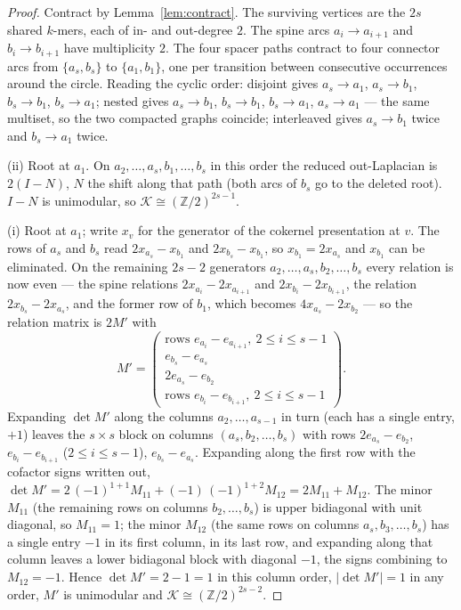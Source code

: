 \documentclass[11pt]{article}
\theoremstyle{plain}
\theoremstyle{definition}
\theoremstyle{remark}
\newcommand{\Z}{\mathbb{Z}}
\newcommand{\K}{\mathcal{K}}
\begin{document}
\begin{proof}
Contract by Lemma~\ref{lem:contract}. The surviving vertices are the $2s$ shared $k$-mers,
each of in- and out-degree $2$. The spine arcs $a_i\to a_{i+1}$ and $b_i\to b_{i+1}$ have
multiplicity $2$. The four spacer paths contract to four connector arcs from
$\{a_s,b_s\}$ to $\{a_1,b_1\}$, one per transition between consecutive occurrences around
the circle. Reading the cyclic order: disjoint gives $a_s\!\to\!a_1$, $a_s\!\to\!b_1$,
$b_s\!\to\!b_1$, $b_s\!\to\!a_1$; nested gives $a_s\!\to\!b_1$, $b_s\!\to\!b_1$,
$b_s\!\to\!a_1$, $a_s\!\to\!a_1$ --- the same multiset, so the two compacted graphs
coincide; interleaved gives $a_s\!\to\!b_1$ twice and $b_s\!\to\!a_1$ twice.

(ii) Root at $a_1$. On $a_2,\dots,a_s,b_1,\dots,b_s$ in this order the reduced out-Laplacian
is $2(I-N)$, $N$ the shift along that path (both arcs of $b_s$ go to the deleted root).
$I-N$ is unimodular, so $\K\cong(\Z/2)^{2s-1}$.

(i) Root at $a_1$; write $x_v$ for the generator of the cokernel presentation at $v$. The
rows of $a_s$ and $b_s$ read $2x_{a_s}-x_{b_1}$ and $2x_{b_s}-x_{b_1}$, so $x_{b_1}=2x_{a_s}$
and $x_{b_1}$ can be eliminated. On the remaining $2s-2$ generators
$a_2,\dots,a_s,b_2,\dots,b_s$ every relation is now even --- the spine relations
$2x_{a_i}-2x_{a_{i+1}}$ and $2x_{b_i}-2x_{b_{i+1}}$, the relation $2x_{b_s}-2x_{a_s}$, and the
former row of $b_1$, which becomes $4x_{a_s}-2x_{b_2}$ --- so the relation matrix is $2M'$
with
\[
M'=\begin{pmatrix}
\text{rows } e_{a_i}-e_{a_{i+1}},\ 2\le i\le s-1\\
e_{b_s}-e_{a_s}\\
2e_{a_s}-e_{b_2}\\
\text{rows } e_{b_i}-e_{b_{i+1}},\ 2\le i\le s-1
\end{pmatrix}.
\]
Expanding $\det M'$ along the columns $a_2,\dots,a_{s-1}$ in turn (each has a single entry,
$+1$) leaves the $s\times s$ block on columns $(a_s,b_2,\dots,b_s)$ with rows
$2e_{a_s}-e_{b_2}$, $e_{b_i}-e_{b_{i+1}}$ ($2\le i\le s-1$), $e_{b_s}-e_{a_s}$.
Expanding along the first row with the cofactor signs written out,
$\det M'=2\,(-1)^{1+1}M_{11}+(-1)\,(-1)^{1+2}M_{12}=2M_{11}+M_{12}$. The minor $M_{11}$ (the
remaining rows on columns $b_2,\dots,b_s$) is upper bidiagonal with unit diagonal, so
$M_{11}=1$; the minor $M_{12}$ (the same rows on columns $a_s,b_3,\dots,b_s$) has a single
entry $-1$ in its first column, in its last row, and expanding along that column leaves a
lower bidiagonal block with diagonal $-1$, the signs combining to $M_{12}=-1$. Hence
$\det M'=2-1=1$ in this column order, $|\det M'|=1$ in any order, $M'$ is unimodular and
$\K\cong(\Z/2)^{2s-2}$.
\end{proof}
\end{document}
